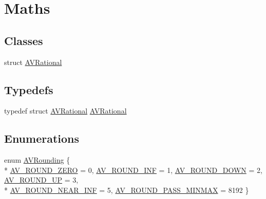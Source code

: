 \hypertarget{group__lavu__math}{}\section{Maths}
\label{group__lavu__math}
\subsection*{Classes}
\begin{DoxyCompactItemize}
\item 
struct \hyperlink{struct_a_v_rational}{A\+V\+Rational}
\end{DoxyCompactItemize}
\subsection*{Typedefs}
\begin{DoxyCompactItemize}
\item 
typedef struct \hyperlink{struct_a_v_rational}{A\+V\+Rational} \hyperlink{group__lavu__math_gac01954259ee41f8ac756277216ecf933}{A\+V\+Rational}
\end{DoxyCompactItemize}
\subsection*{Enumerations}
\begin{DoxyCompactItemize}
\item 
enum \hyperlink{group__lavu__math_ga921d656eaf2c4d6800a734a13af021d0}{A\+V\+Rounding} \{ \\*
\hyperlink{group__lavu__math_gga921d656eaf2c4d6800a734a13af021d0a35e291756025351803b97f7522b56eab}{A\+V\+\_\+\+R\+O\+U\+N\+D\+\_\+\+Z\+E\+RO} = 0, 
\hyperlink{group__lavu__math_gga921d656eaf2c4d6800a734a13af021d0a0ac08aede35de739ec5d0c1ba6217126}{A\+V\+\_\+\+R\+O\+U\+N\+D\+\_\+\+I\+NF} = 1, 
\hyperlink{group__lavu__math_gga921d656eaf2c4d6800a734a13af021d0a4a4b2c2c77b7e20884440f7e57cfdb98}{A\+V\+\_\+\+R\+O\+U\+N\+D\+\_\+\+D\+O\+WN} = 2, 
\hyperlink{group__lavu__math_gga921d656eaf2c4d6800a734a13af021d0aa1d28e08e2f8b49b256e056f93038c1a}{A\+V\+\_\+\+R\+O\+U\+N\+D\+\_\+\+UP} = 3, 
\\*
\hyperlink{group__lavu__math_gga921d656eaf2c4d6800a734a13af021d0aea95b00154ff83c740b46376dfa06e11}{A\+V\+\_\+\+R\+O\+U\+N\+D\+\_\+\+N\+E\+A\+R\+\_\+\+I\+NF} = 5, 
\hyperlink{group__lavu__math_gga921d656eaf2c4d6800a734a13af021d0a7fcb56631d6898b282d6c78ce6c14a43}{A\+V\+\_\+\+R\+O\+U\+N\+D\+\_\+\+P\+A\+S\+S\+\_\+\+M\+I\+N\+M\+AX} = 8192
 \}
\end{DoxyCompactItemize}
